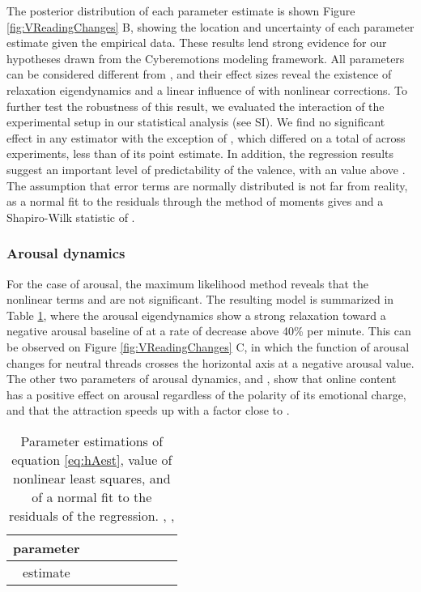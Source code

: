 \documentclass[nologo,url,11pt,a4paper]{ETHpaper}
\begin{document}
The posterior distribution of each parameter estimate is shown Figure  \ref{fig:VReadingChanges} B, showing the location and
uncertainty of each parameter estimate given the empirical data.   These
results lend strong evidence for our hypotheses drawn from the Cyberemotions
modeling framework. All parameters can be considered different from , and
their effect sizes reveal the existence of  relaxation eigendynamics and a
linear  influence of  with nonlinear corrections. To further test the
robustness of this result, we evaluated  the interaction of the experimental
setup in our statistical analysis (see SI). We find no significant effect in
any estimator with the exception of , which differed on a
total of  across experiments, less than  of its point estimate. In
addition, the regression results suggest an important level of predictability
of the valence, with an  value above . The assumption that error terms
are normally distributed is not far from reality, as a normal fit to the
residuals through the method of moments gives  and a Shapiro-Wilk statistic of .

\subsubsection{Arousal dynamics}

For the case of arousal, the maximum likelihood method reveals that the
nonlinear terms  and  are not significant. The
resulting model is summarized in Table \ref{tab:AregAll}, where the arousal
eigendynamics show a strong relaxation toward a negative arousal baseline of
 at a rate of decrease above 40\% per minute. This can be
observed on Figure \ref{fig:VReadingChanges} C, in which the
function of arousal changes for neutral threads crosses the horizontal axis at
a negative arousal value. The other two parameters of arousal dynamics,
 and , show that online content has a positive
effect on arousal regardless of the polarity of its emotional charge, and that
the attraction speeds up with a factor close to . 

\begin{table}[!ht]
\centering
\begin{tabular}{ c | c  c  c  c | c  c c }
parameter 	& 		&    			&   			&    	 &   &   &   \\ \hline 
estimate    & 	& 	&  	&  &  &  & 
\end{tabular}
\caption{Parameter estimations of equation \ref{eq:hAest},  value of
nonlinear least squares, and   of a normal fit to the residuals of
the regression.    , ,
\label{tab:AregAll}}
\end{table}
\end{document}

